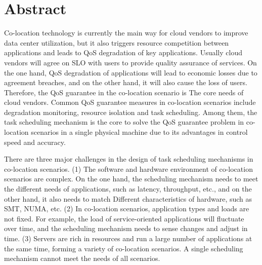 \intobmk\chapter*{Abstract}%

Co-location technology is currently the main way for cloud vendors to improve data center utilization, but it also triggers resource competition between applications and leads to QoS degradation of key applications. Usually cloud vendors will agree on SLO with users to provide quality assurance of services. On the one hand, QoS degradation of applications will lead to economic losses due to agreement breaches, and on the other hand, it will also cause the loss of users. Therefore, the QoS guarantee in the co-location scenario is The core needs of cloud vendors. Common QoS guarantee measures in co-location scenarios include degradation monitoring, resource isolation and task scheduling. Among them, the task scheduling mechanism is the core to solve the QoS guarantee problem in co-location scenarios in a single physical machine due to its advantages in control speed and accuracy.

There are three major challenges in the design of task scheduling mechanisms in co-location scenarios. (1) The software and hardware environment of co-location scenarios are complex. On the one hand, the scheduling mechanism needs to meet the different needs of applications, such as latency, throughput, etc., and on the other hand, it also needs to match Different characteristics of hardware, such as SMT, NUMA, etc. (2) In co-location scenarios, application types and loads are not fixed. For example, the load of service-oriented applications will fluctuate over time, and the scheduling mechanism needs to sense changes and adjust in time. (3) Servers are rich in resources and run a large number of applications at the same time, forming a variety of co-location scenarios. A single scheduling mechanism cannot meet the needs of all scenarios.

